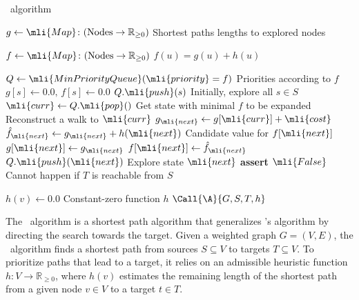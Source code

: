 \begin{algorithm}[t]
	\caption{\A~algorithm} \label{alg:astar}
	\begin{algorithmic}[1]
		\State $g \gets \mli{Map}\colon (\text{Nodes} \to \mathbb{R}_{\geq 0})$
		\Comment Shortest paths lengths to explored nodes

		\State $f \gets \mli{Map}\colon (\text{Nodes} \to \mathbb{R}_{\geq 0})$
		\Comment $f(u)=g(u)+h(u)$ 

		\State $Q \gets \mli{MinPriorityQueue}(\mli{priority}=f)$ 
		\Comment Priorities according to $f$
			\State $g[s] \gets 0.0,\, f[s] \gets 0.0$
			\State $Q.\mli{push}(s)$
			\Comment Initially, explore all $s \in S$
		\EndFor
			\State $\mli{curr} \gets Q.\mli{pop}()$
			\Comment Get state with minimal $f$ to be expanded
				\State \Return {}
				\Comment Reconstruct a walk to $\mli{curr}$
			\EndIf
			\State $g_\mli{next} \gets g[\mli{curr}] + \mli{cost}$
			\State $\hat{f}_\mli{next} \gets g_\mli{next} + h(\mli{next})$
				\Comment Candidate value for $f[\mli{next}]$
					\State $g[\mli{next}] \gets g_\mli{next}$		
					\State $f[\mli{next}] \gets \hat{f}_\mli{next}$		
					\State $Q.\mli{push}(\mli{next})$
					\Comment Explore state $\mli{next}$
				\EndIf
		\EndFor
		\EndWhile
		\State \textbf{assert} $\mli{False}$
		\Comment Cannot happen if $T$ is reachable from $S$
		\EndFunction

		\Statex

			\State $h(v) \gets 0.0$
			\Comment Constant-zero function $h$
			\State $\Call{\A}{G,S,T,h}$
		\EndFunction
	\end{algorithmic}
\end{algorithm}


%
The \A~algorithm is a shortest path algorithm that generalizes \dijkstra's
algorithm by directing the search towards the target.
Given a weighted graph $G=(V,E)$, the \A~algorithm finds a shortest path from
sources $S \subseteq V$ to targets $T \subseteq V$.
%
To prioritize paths that lead to a target, it relies on an admissible heuristic
function $h \colon V \to \mathbb{R}_{\geq 0}$, where $h(v)$ estimates the
remaining length of the shortest path from a given node $v \in V$ to a target
$t \in T$.



